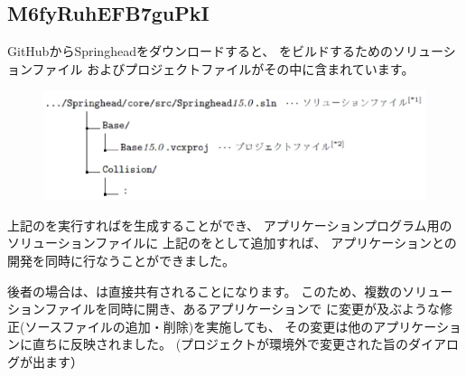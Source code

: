 \subsection{M6fyRuhEFB7guPkI}
\label{subsec:ConventionalMethod}

\noindent
GitHub\KLUDGE からSpringhead\KLUDGE をダウンロードすると、
\SprLib \KLUDGE をビルドするためのソリューションファイル
\KLUDGE およびプロジェクトファイルがその中に含まれています。

\medskip
\ifLwarp
{}
\begin{narrow}[15pt]
	\begin{figure}[h]
	    \begin{center}
	    \includegraphics[width=.9\textwidth]{fig/DownloadTree.eps}
	    \end{center}
	    \label{fig:DownloadTree}
	\end{figure}
\end{narrow}
\else
\begin{narrow}
    \begin{narrow}[20pt]\begin{minipage}{\textwidth}
	{\footnotesize{}}
	\medskip
  \end{minipage}\end{narrow}
\end{narrow}
\fi

\noindent
\KLUDGE 上記の\SolutionFile \KLUDGE を実行すれば\SprLib \KLUDGE を生成することができ、
\KLUDGE アプリケーションプログラム用のソリューションファイルに
\KLUDGE 上記の\ProjectFile \KLUDGE を\KLUDGE として追加すれば、
\KLUDGE アプリケーションと\SprLib \KLUDGE の開発を同時に行なうことができました。

\KLUDGE 後者の場合は、\ProjectFile \KLUDGE は直接共有されることになります。
\KLUDGE このため、複数のソリューションファイルを同時に開き、あるアプリケーションで
\ProjectFile \KLUDGE に変更が及ぶような修正(\KLUDGE ソースファイルの追加・削除)\KLUDGE を実施しても、
\KLUDGE その変更は他のアプリケーションに直ちに反映されました。
(\KLUDGE プロジェクトが環境外で変更された旨のダイアログが出ます）

